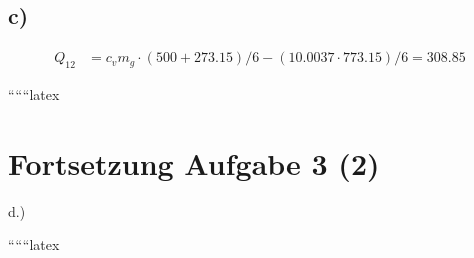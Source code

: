 

\subsection*{c)}
\begin{align*}
    Q_{12} &= c_v m_g \cdot \left( 500 + 273.15 \right) / 6 - \left( 10.0037 \cdot 773.15 \right) / 6 = 308.85
\end{align*}

``````latex


\section*{Fortsetzung Aufgabe 3 (2)}

d.)

``````latex